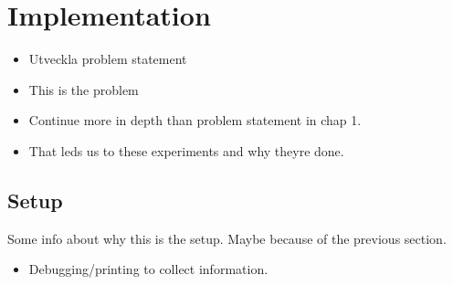 \section{Implementation}


\begin{itemize}
\item Utveckla problem statement
\item This is the problem
\item Continue more in depth than problem statement in chap 1.
\item That leds us to these experiments and why theyre done.
\end{itemize}


\subsection{Setup}

Some info about why this is the setup. Maybe because of the previous section.
\begin{itemize}
\item Debugging/printing to collect information.
\end{itemize}








